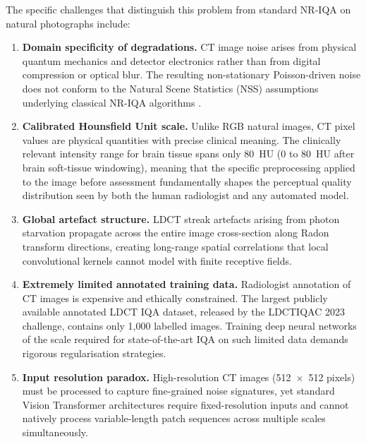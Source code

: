 The specific challenges that distinguish this problem from standard NR-IQA on natural
photographs include:

\begin{enumerate}
    \item \textbf{Domain specificity of degradations.} CT image noise arises from physical
    quantum mechanics and detector electronics rather than from digital compression or
    optical blur. The resulting non-stationary Poisson-driven noise does not conform to
    the Natural Scene Statistics (NSS) assumptions underlying classical NR-IQA algorithms
    \cite{brisque_original, niqe_original}.

    \item \textbf{Calibrated Hounsfield Unit scale.} Unlike RGB natural images, CT pixel
    values are physical quantities with precise clinical meaning. The clinically relevant
    intensity range for brain tissue spans only 80~HU (0 to 80~HU after brain soft-tissue
    windowing), meaning that the specific preprocessing applied to the image before
    assessment fundamentally shapes the perceptual quality distribution seen by both the
    human radiologist and any automated model.

    \item \textbf{Global artefact structure.} LDCT streak artefacts arising from photon
    starvation propagate across the entire image cross-section along Radon transform
    directions, creating long-range spatial correlations that local convolutional kernels
    cannot model with finite receptive fields.

    \item \textbf{Extremely limited annotated training data.} Radiologist annotation of
    CT images is expensive and ethically constrained. The largest publicly available
    annotated LDCT IQA dataset, released by the LDCTIQAC 2023 challenge, contains only
    1,000 labelled images. Training deep neural networks of the scale required for
    state-of-the-art IQA on such limited data demands rigorous regularisation strategies.

    \item \textbf{Input resolution paradox.} High-resolution CT images (512~$\times$~512
    pixels) must be processed to capture fine-grained noise signatures, yet standard
    Vision Transformer architectures require fixed-resolution inputs and cannot natively
    process variable-length patch sequences across multiple scales simultaneously.
\end{enumerate}

